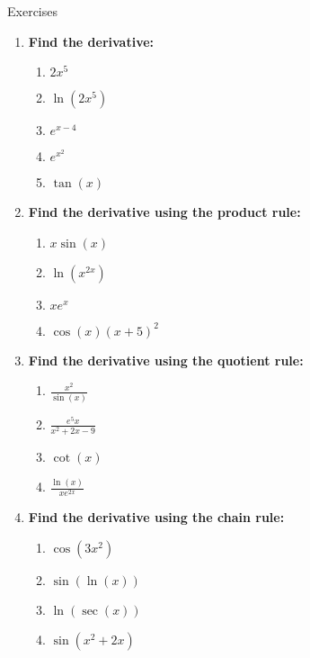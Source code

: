 \documentclass[../revisedmain.tex]{subfiles}
\begin{document}
\begin{center}
	{\Large Exercises}
\end{center}
\begin{enumerate}
	\item \textbf{Find the derivative:}
	\begin{enumerate}
		\item \(2x^5\)
		\item \(\ln(2x^5)\)
		\item \(e^{x-4}\)
		\item \(e^{x^2}\)
		\item \(\tan(x)\)
	\end{enumerate}
	\item \textbf{Find the derivative using the product rule:}
	\begin{enumerate}
		\item \(x\sin(x)\)
		\item \(\ln(x^{2x})\)
		\item \(xe^x\)
		\item \(\cos(x)(x+5)^2\)
	\end{enumerate}
	\item \textbf{Find the derivative using the quotient rule:}
	\begin{enumerate}
		\item \(\displaystyle\frac{x^2}{\sin(x)}\)
		\item \(\displaystyle\frac{e^5x}{x^2+2x-9}\)
		\item \(\cot(x)\)
		\item \(\displaystyle\frac{\ln(x)}{xe^{2x}}\)
	\end{enumerate}
	\item \textbf{Find the derivative using the chain rule:}
	\begin{enumerate}
		\item \(\cos(3x^2)\)
		\item \(\sin(\ln(x))\)
		\item \(\ln(\sec(x))\)
		\item \(\sin(x^2+2x)\)
	\end{enumerate}
\end{enumerate}
\end{document}

